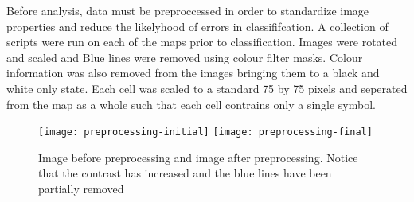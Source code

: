 Before analysis, data must be preproccessed in order to standardize image properties and reduce the likelyhood of errors in classififcation. A collection of scripts were run on each of the maps prior to classification. Images were rotated and scaled and Blue lines were removed using colour filter masks. Colour information was also removed from the images bringing them to a black and white only state. Each cell was scaled to a standard 75 by 75 pixels and seperated from the map as a whole such that each cell contrains only a single symbol.

\begin{figure}[h]
    \begin{center}
    \texttt{[image: preprocessing-initial]}
    \texttt{[image: preprocessing-final]}
    \caption{Image before preprocessing and image after preprocessing. Notice
        that the contrast has increased and the blue lines have been partially
        removed}
    \end{center}
\end{figure}
